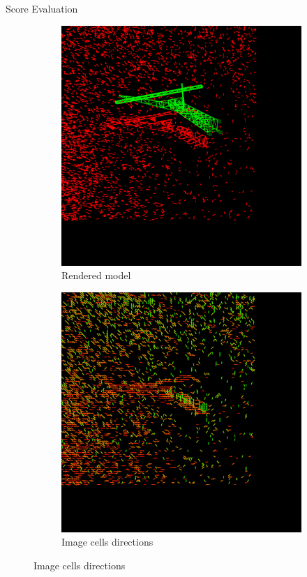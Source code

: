 \documentclass{beamer}
\begin{document}
\begin{frame}[t, fragile]{Score Evaluation}
\begin{figure}
\centering
\begin{subfigure}{.5\textwidth}
\centering
\includegraphics[scale=0.15]{segment_eval}
\caption{Rendered model}
\end{subfigure}%
\begin{subfigure}{.5\textwidth}
\includegraphics[scale=0.073]{gauss_blur}
\caption{Image cells directions}
\end{subfigure}
\end{figure}
\end{frame}
\end{document}

